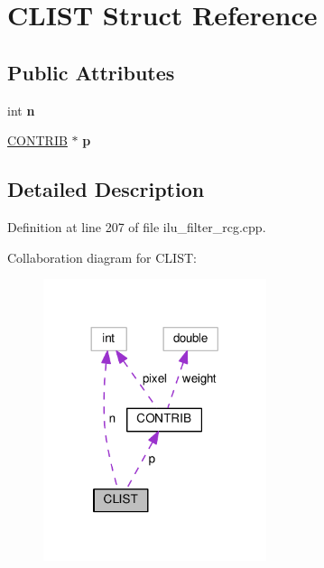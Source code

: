 \hypertarget{structCLIST}{}\section{C\+L\+I\+ST Struct Reference}
\label{structCLIST}
\subsection*{Public Attributes}
\begin{DoxyCompactItemize}
\item 
\mbox{\label{structCLIST_a45dc4be27394bc1e5b46fb8e1fee798c}} 
int {\bfseries n}
\item 
\mbox{\label{structCLIST_a2b8eedef16f5e74fdf5770dd86a66d40}} 
\hyperlink{structCONTRIB}{C\+O\+N\+T\+R\+IB} $\ast$ {\bfseries p}
\end{DoxyCompactItemize}


\subsection{Detailed Description}


Definition at line 207 of file ilu\+\_\+filter\+\_\+rcg.\+cpp.



Collaboration diagram for C\+L\+I\+ST\+:
\nopagebreak
\begin{figure}[H]
\begin{center}
\leavevmode
\includegraphics[width=185pt]{d9/dc6/structCLIST__coll__graph}
\end{center}
\end{figure}


